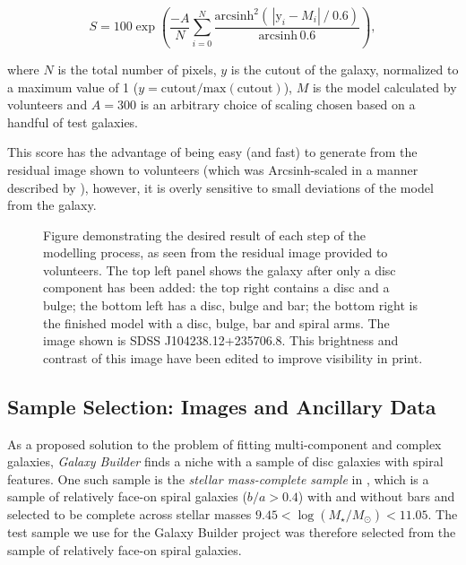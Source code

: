 \documentclass[trackchanges]{aastex63}
\begin{document}
\begin{equation}
  \label{eqn:gal_score}
    S = 100 \exp\left(\frac{-A}{N}\sum_{i=0}^N\frac{\text{arcsinh}^2\left(\,|\text{y}_i - M_i|\ /\ 0.6\right)}{\text{arcsinh}\,0.6 }\right),
\end{equation}

where $N$ is the total number of pixels, $y$ is the cutout of the galaxy, normalized to a maximum value of 1 ($y = \text{cutout}/\text{max}(\text{cutout})$), $M$ is the model calculated by volunteers and $A=300$ is an arbitrary choice of scaling chosen based on a handful of test galaxies.

This score has the advantage of being easy (and fast) to generate from the residual image shown to volunteers (which was Arcsinh-scaled in a manner described by \citealt{Lupton2003:astro-ph/0312483v1}), however, it is overly sensitive to small deviations of the model from the galaxy.

\begin{figure}
  \caption{Figure demonstrating the desired result of each step of the modelling process, as seen from the residual image provided to volunteers. The top left panel shows the galaxy after only a disc component has been added: the top right contains a disc and a bulge; the bottom left has a disc, bulge and bar; the bottom right is the finished model with a disc, bulge, bar and spiral arms. The image shown is SDSS J104238.12+235706.8. This brightness and contrast of this image have been edited to improve visibility in print.}
  \label{fig:residualsStepByStep}
\end{figure}


\subsection{Sample Selection: Images and Ancillary Data}
\label{sec:data}

As a proposed solution to the problem of fitting multi-component and complex galaxies, \textit{Galaxy Builder} finds a niche with a sample of disc galaxies with spiral features. One such sample is the \textit{stellar mass-complete sample} in \citet{2017MNRAS.472.2263H}, which is a sample of relatively face-on spiral galaxies ($b/a > 0.4$) with and without bars and selected to be complete across stellar masses $9.45 < \log(M_\star / M_\odot) < 11.05$. The test sample we use for the Galaxy Builder project was therefore selected from the \citet{2017MNRAS.472.2263H} sample of relatively face-on spiral galaxies.
\end{document}
